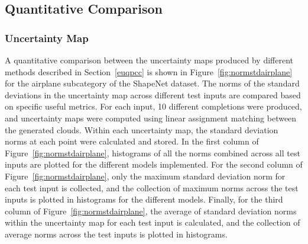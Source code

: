     \subsection{Quantitative Comparison}
    
        \subsubsection{Uncertainty Map}
        A quantitative comparison between the uncertainty maps produced by different methods described in Section~\ref{euqpcc} is shown in Figure~\ref{fig:normstdairplane} for the airplane subcategory of the ShapeNet dataset. The norms of the standard deviations in the uncertainty map across different test inputs are compared based on specific useful metrics. For each input, 10 different completions were produced, and uncertainty maps were computed using linear assignment matching between the generated clouds. Within each uncertainty map, the standard deviation norms at each point were calculated and stored. In the first column of Figure~\ref{fig:normstdairplane}, histograms of all the norms combined across all test inputs are plotted for the different models implemented. For the second column of Figure~\ref{fig:normstdairplane}, only the maximum standard deviation norm for each test input is collected, and the collection of maximum norms across the test inputs is plotted in histograms for the different models. Finally, for the third column of Figure~\ref{fig:normstdairplane}, the average of standard deviation norms within the uncertainty map for each test input is calculated, and the collection of average norms across the test inputs is plotted in histograms.
